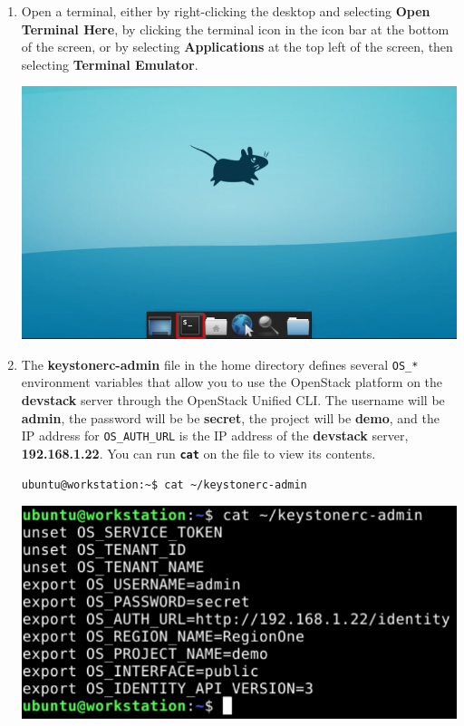 \documentclass[letterpaper, 12pt]{article}
\begin{document}
\begin{enumerate}
    \item Open a terminal, either by right-clicking the desktop and selecting \textbf{Open Terminal Here}, by clicking
    the terminal icon in the icon bar at the bottom of the screen, or by selecting \textbf{Applications} at the top
    left of the screen, then selecting \textbf{Terminal Emulator}.

    \begin{center}
        \includegraphics[width=\linewidth]{images/part2/step1.png}
    \end{center}

    \item The \textbf{keystonerc-admin} file in the home directory defines several \texttt{OS\_*} environment variables
    that allow you to use the OpenStack platform on the \textbf{devstack} server through the OpenStack Unified
    CLI. The username will be \textbf{admin}, the password will be be \textbf{secret}, the project will be
    \textbf{demo}, and the IP address for \texttt{OS\_AUTH\_URL} is the IP address of the \textbf{devstack} server,
    \textbf{192.168.1.22}. You can run \textbf{\texttt{cat}} on the file to view its contents.
\begin{lstlisting}
ubuntu@workstation:~$ cat ~/keystonerc-admin
\end{lstlisting}

    \begin{center}
        \includegraphics[width=\linewidth]{images/part2/step2.png}
    \end{center}


\end{enumerate}
\end{document}
